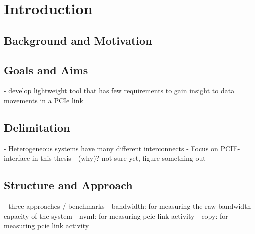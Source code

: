 
\chapter{Introduction}\label{chapter:introduction}

\section{Background and Motivation}

\section{Goals and Aims}

- develop lightweight tool that has few requirements to gain insight to data movements in a PCIe link

\section{Delimitation}

- Heterogeneous systems have many different interconnects
- Focus on PCIE-interface in this thesis
- (why)? not sure yet, figure something out

\section{Structure and Approach}

- three approaches / benchmarks
- bandwidth: for measuring the raw bandwidth capacity of the system
- nvml: for measuring pcie link activity
- copy: for measuring pcie link activity